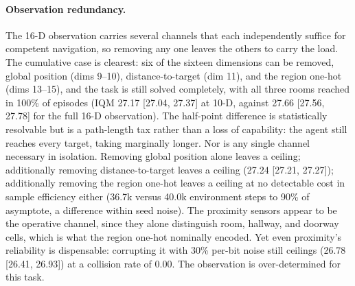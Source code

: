 \paragraph{Observation redundancy.} The 16-D observation carries several channels that each
independently suffice for competent navigation, so removing any one leaves the others to carry
the load. The cumulative case is clearest: six of the sixteen dimensions can be removed,
global position (dims 9--10), distance-to-target (dim 11), and the region one-hot (dims
13--15), and the task is still solved completely, with all three rooms reached in 100\% of
episodes (IQM 27.17 [27.04, 27.37] at 10-D, against 27.66 [27.56, 27.78] for the full 16-D
observation). The half-point difference is statistically resolvable but is a path-length tax
rather than a loss of capability: the agent still reaches every target, taking marginally
longer. Nor is any single channel necessary in isolation. Removing global position alone
leaves a ceiling; additionally removing distance-to-target leaves a ceiling (27.24 [27.21,
27.27]); additionally removing the region one-hot leaves a ceiling at no detectable cost in
sample efficiency either (36.7k versus 40.0k environment steps to 90\% of asymptote, a
difference within seed noise). The proximity sensors appear to be the operative channel, since
they alone distinguish room, hallway, and doorway cells, which is what the region one-hot
nominally encoded. Yet even proximity's reliability is dispensable: corrupting it with 30\%
per-bit noise still ceilings (26.78 [26.41, 26.93]) at a collision rate of 0.00. The
observation is over-determined for this task.

